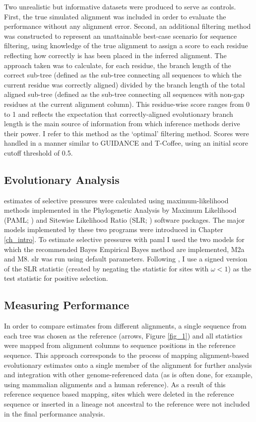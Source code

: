 Two unrealistic but informative datasets were produced to serve as
controls. First, the true simulated alignment was included in order to
evaluate the \sw performance without any alignment error. Second, an
additional filtering method was constructed to represent an
unattainable best-case scenario for sequence filtering, using
knowledge of the true alignment to assign a score to each residue
reflecting how correctly is has been placed in the inferred
alignment. The approach taken was to calculate, for each residue, the
branch length of the correct sub-tree (defined as the sub-tree
connecting all sequences to which the current residue was correctly
aligned) divided by the branch length of the total aligned sub-tree
(defined as the sub-tree connecting all sequences with non-gap
residues at the current alignment column). This residue-wise score
ranges from 0 to 1 and reflects the expectation that correctly-aligned
evolutionary branch length is the main source of information from
which \sw inference methods derive their power. I refer to this method
as the `optimal' filtering method. Scores were handled in a manner
similar to GUIDANCE and T-Coffee, using an initial score cutoff
threshold of 0.5.

\subsection{\Sw Evolutionary Analysis}

\Sw estimates of selective pressures were calculated using
maximum-likelihood methods implemented in the Phylogenetic Analysis by
Maximum Likelihood (PAML; \citealt{Yang2007PAML}) and Sitewise
Likelihood Ratio (SLR; \citealt{Massingham2005}) software
packages. The major models implemented by these two programs were
introduced in Chapter \ref{ch_intro}. To estimate \sw selective
pressures with \ac{paml} I used the two models for which the
recommended Bayes Empirical Bayes method are implemented, M2a and
M8. \ac{slr} was run using default parameters. Following
\citet{Massingham2005}, I use a signed version of the SLR statistic
(created by negating the statistic for sites with $\omega<1$) as the
test statistic for positive selection.

\subsection{Measuring Performance}

In order to compare \sw estimates from different alignments, a single
sequence from each tree was chosen as the reference (arrows, Figure
\ref{fig_1}) and all \sw statistics were mapped from alignment columns
to sequence positions in the reference sequence. This approach
corresponds to the process of mapping alignment-based evolutionary
estimates onto a single member of the alignment for further analysis
and integration with other genome-referenced data (as is often done,
for example, using mammalian alignments and a human reference). As a
result of this reference sequence based mapping, sites which were
deleted in the reference sequence or inserted in a lineage not
ancestral to the reference were not included in the final performance
analysis.

